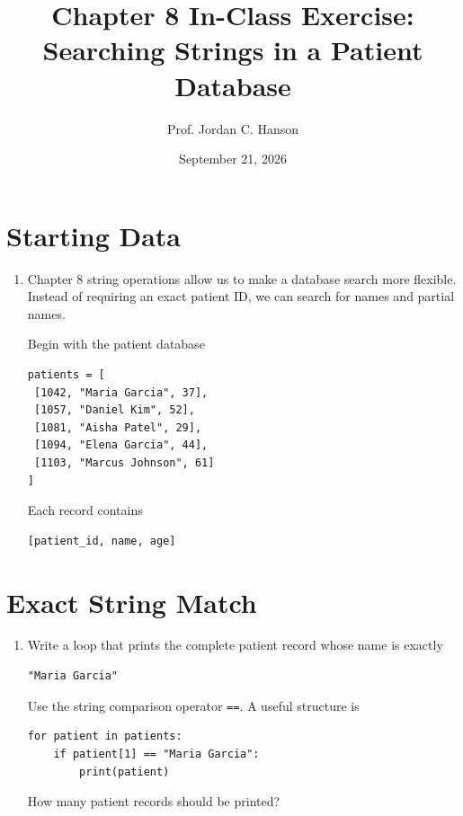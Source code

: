 \documentclass{article}
\begin{document}
\twocolumn

\title{Chapter 8 In-Class Exercise: Searching Strings in a Patient Database}
\author{Prof. Jordan C. Hanson}
\date{September 21, 2026}

\maketitle

\section{Starting Data}

\begin{enumerate}

\item Chapter 8 string operations allow us to make a database
search more flexible.  Instead of requiring an exact patient ID,
we can search for names and partial names.

Begin with the patient database

\begin{verbatim}
patients = [
 [1042, "Maria Garcia", 37],
 [1057, "Daniel Kim", 52],
 [1081, "Aisha Patel", 29],
 [1094, "Elena Garcia", 44],
 [1103, "Marcus Johnson", 61]
]
\end{verbatim}

Each record contains

\begin{verbatim}
[patient_id, name, age]
\end{verbatim}

\end{enumerate}


\section{Exact String Match}

\begin{enumerate}

\item Write a loop that prints the complete patient record whose
name is exactly

\begin{verbatim}
"Maria Garcia"
\end{verbatim}

Use the string comparison operator \texttt{==}.  A useful structure is

\begin{verbatim}
for patient in patients:
    if patient[1] == "Maria Garcia":
        print(patient)
\end{verbatim}

How many patient records should be printed?

\end{enumerate}
\end{document}
